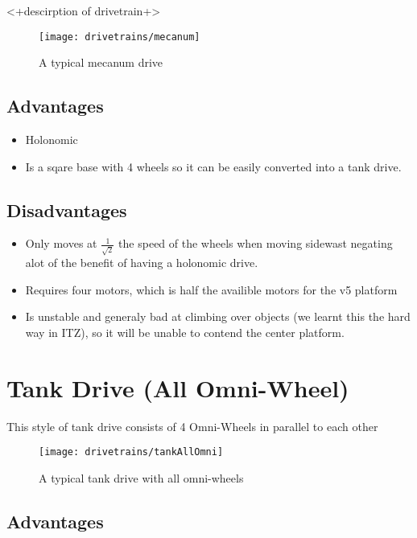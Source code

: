 \documentclass[../../main.tex]{subfiles}
\begin{document}
<+descirption of drivetrain+>

\begin{figure}[h]
	\centering
    \texttt{[image: drivetrains/mecanum]}
	\caption{A typical mecanum drive}
	\label{fig:drivetrainMecanum}
\end{figure}

\subsection{Advantages}

\begin{itemize}
	\item Holonomic
    \item Is a sqare base with 4 wheels so it can be easily converted 
          into a tank drive.
\end{itemize}


\subsection{Disadvantages}

\begin{itemize}
    \item Only moves at $\frac{1}{\sqrt{2}}$ the speed of the wheels when moving sidewast
          negating alot of the benefit of having a holonomic drive.
    \item Requires four motors, which is half the availible motors for the v5 platform
    \item Is unstable and generaly bad at climbing over objects (we learnt this the hard
          way in ITZ), so it will be unable to contend the center platform.
\end{itemize}



\section{Tank Drive (All Omni-Wheel)}

This style of tank drive consists of 4 Omni-Wheels in parallel to each other

\begin{figure}[h]
	\centering
	\texttt{[image: drivetrains/tankAllOmni]}
	\caption{A typical tank drive with all omni-wheels}
	\label{fig:drivetrainTankAllOmni}
\end{figure}

\subsection{Advantages}
\end{document}
